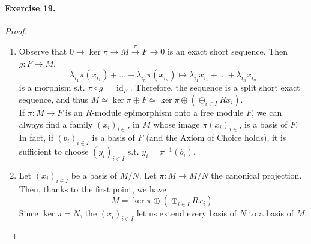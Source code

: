 \documentclass[12pt,a4paper]{report}
\theoremstyle{definition}
\theoremstyle{num.custom-title}
\DeclareMathOperator{\id}{id}
\begin{document}
\paragraph{Exercise 19.}
\begin{proof}\ 
\begin{enumerate}
\item Observe that $0 \to \ker \pi \to M \stackrel{\pi}{\to} F \to 0$ is an exact short sequence. Then $g: F \to M$, 
\[
\lambda_{i_1} \pi(x_{i_1}) + ... + \lambda_{i_n} \pi(x_{i_n}) \mapsto \lambda_{i_1} x_{i_1} + ... + \lambda_{i_n} x_{i_n}
\]
is a morphism s.t. $\pi \circ g = \id_F$. Therefore, the sequence is a split short exact sequence, and thus $M \simeq \ker \pi \oplus F \simeq \ker \pi \oplus (\oplus_{i \in I} R x_i)$.\\
If $\pi: M \to F$ is an $R$-module epimorphism onto a free module $F$, we can always find a family $(x_i)_{i \in I}$ in $M$ whose image $\pi(x_i)_{i \in I}$ is a basis of $F$. In fact, if $(b_i)_{i \in I}$ is a basis of $F$ (and the Axiom of Choice holds), it is sufficient to choose $(y_i)_{i \in I}$ s.t. $y_i=\pi^{-1}(b_i)$.
\item Let $(x_i)_{i \in I}$ be a basis of $M/N$. Let $\pi : M \to M/N$ the canonical projection. Then, thanks to the first point, we have 
\[
M= \ker \pi \oplus (\oplus_{i \in I} R x_i).
\]
Since $\ker \pi=N$, the $(x_i)_{i \in I}$ let us extend every basis of $N$ to a basis of $M$.
\end{enumerate}
\end{proof}
\end{document}
